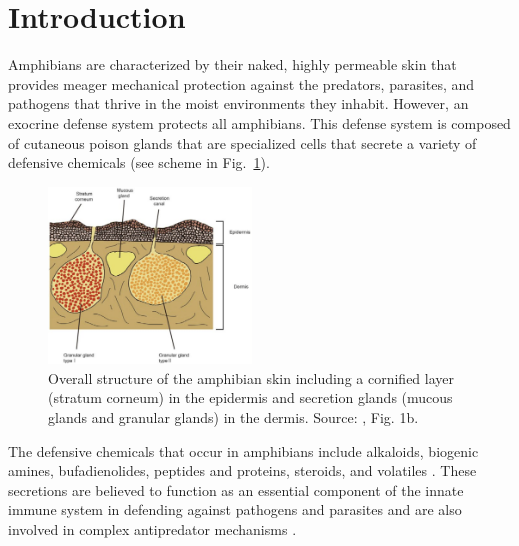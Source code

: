 \section{Introduction}

Amphibians are characterized by their naked, highly permeable skin that provides meager mechanical protection against the predators, parasites, and pathogens that thrive in the moist environments they inhabit. However, an exocrine defense system protects all amphibians. This defense system is composed of cutaneous poison glands \citep{toledo1995cutaneous} that are specialized cells that secrete a variety of defensive chemicals \citep[i.e., substances that an organism produce to reduce the risk of bodily harm by another organism; see~][]{berenbaum1995chemistry} (see scheme in Fig.~\ref{fig:skin}).

\begin{figure}
    \centering
    \vspace{-\intextsep}\hspace*{-.75\columnsep}
    \includegraphics[width=0.48\textwidth]{figs/skin.png}
    \caption{Overall structure of the amphibian skin including a cornified layer (stratum corneum) in the epidermis and secretion glands (mucous glands and granular glands) in the dermis. Source: \citealt{yokoyama2018skin}, Fig. 1b.}
    \label{fig:skin}
\end{figure}

The defensive chemicals that occur in amphibians include alkaloids, biogenic amines, bufadienolides, peptides and proteins, steroids, and volatiles \citep{daly1987further, daly2005alkaloids, erspamer1994bioactive, daly2004biologically, pukala2006host}. These secretions are believed to function as an essential component of the innate immune system in defending against pathogens and parasites \citep{rivas2009amphibian, conlon2011contribution} and are also involved in complex antipredator mechanisms \citep{brodie1991predator}.

